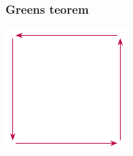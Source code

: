 \begin{frame}
  \frametitle{Greens teorem}
  \begin{intuisjon}
    \centering
    \begin{minipage}{.30\textwidth}
      \centering
      \includegraphics[width=\linewidth]{../img/Greens-intuition-1}%
    \end{minipage}\qquad
    \begin{minipage}{.30\textwidth}
      \centering

\end{minipage}
\end{intuisjon}
\end{frame}
